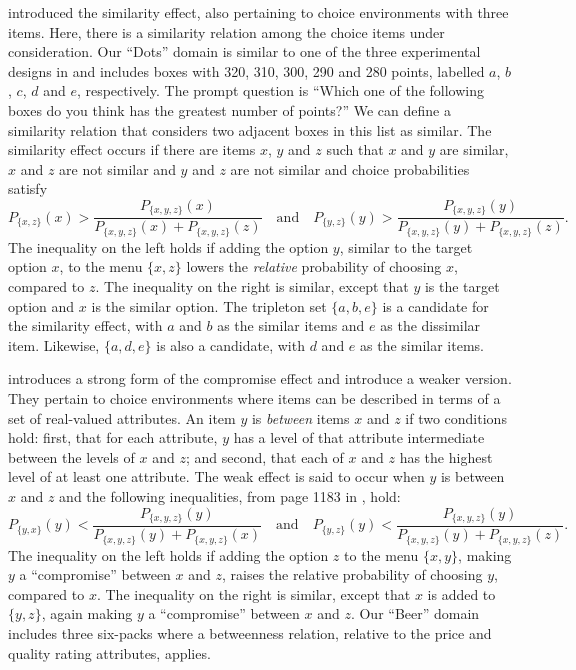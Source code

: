 \documentclass[11pt,letter]{article}
\newcommand{\menu}{menu}
\newcommand{\bin}[2]{P_{\{#1,#2\}}(#1)}
\begin{document}
\citet{Tver72a} introduced the similarity effect, also pertaining to choice environments with three items.
Here, there is a similarity relation among the choice items under consideration.
Our ``Dots'' domain is similar to one of the three experimental designs in \citet{Tver72a} and includes boxes with 320, 310, 300, 290 and 280 points, labelled $a$, $b$, $c$, $d$ and $e$, respectively.
The prompt question is ``Which one of the following boxes do you think has the greatest number of points?''
We can define a similarity relation that considers two adjacent boxes in this list as similar.
The similarity effect occurs if there are items $x$, $y$ and $z$ such that $x$ and $y$ are similar, $x$ and $z$ are not similar and $y$ and $z$ are not similar and choice probabilities satisfy
\begin{equation}
  \bin{x}{z} > \frac{P_{\{x,y,z\}}(x)}{P_{\{x,y,z\}}(x) + P_{\{x,y,z\}}(z)}
  \quad \mbox{and} \quad
  \bin{y}{z} > \frac{P_{\{x,y,z\}}(y)}{P_{\{x,y,z\}}(y) + P_{\{x,y,z\}}(z)}.
\end{equation}
The inequality on the left holds if adding the option $y$, similar to the target option $x$, to the \menu{} $\{x,z\}$ lowers the {\em relative} probability of choosing $x$, compared to $z$.
The inequality on the right is similar, except that $y$ is the target option and $x$ is the similar option.
The tripleton set $\{a, b, e\}$ is a candidate for the similarity effect, with $a$ and $b$ as the similar items and $e$ as the dissimilar item.
Likewise, $\{a, d, e\}$ is also a candidate, with $d$ and $e$ as the similar items.

\citet{Simo89} introduces a strong form of the compromise effect and \citet{TverSimo93} introduce a weaker version.
They pertain to choice environments where items can be described in terms of a set of real-valued attributes.
An item $y$ is {\em between} items $x$ and $z$ if two conditions hold: first, that for each attribute, $y$ has a level of that attribute intermediate between the levels of $x$ and $z$; and second, that each of $x$ and $z$ has the highest level of at least one attribute.
The weak effect is said to occur when $y$ is between $x$ and $z$ and the following inequalities, from page 1183 in \citet{TverSimo93}, hold:
\begin{equation}
  \bin{y}{x} < \frac{P_{\{x,y,z\}}(y)}{P_{\{x,y,z\}}(y) + P_{\{x,y,z\}}(x)}
  \quad \mbox{and} \quad
  \bin{y}{z} < \frac{P_{\{x,y,z\}}(y)}{P_{\{x,y,z\}}(y) + P_{\{x,y,z\}}(z)}.
\end{equation}
The inequality on the left holds if adding the option $z$ to the \menu{} $\{x,y\}$, making $y$ a ``compromise'' between $x$ and $z$, raises the relative probability of choosing $y$, compared to $x$.
The inequality on the right is similar, except that $x$ is added to $\{y,z\}$, again making $y$ a ``compromise'' between $x$ and $z$.
Our ``Beer'' domain includes three six-packs where a betweenness relation, relative to the price and quality rating attributes, applies.
\end{document}

